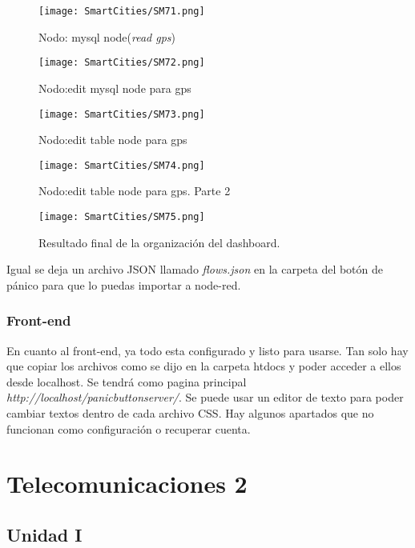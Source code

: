\documentclass[
	11pt, %
	fleqn, %
	a4paper, %
]{LegrandOrangeBook}
\begin{document}
\begin{figure}[H]
\centering\texttt{[image: SmartCities/SM71.png]}
\caption{Nodo: mysql node(\textit{read gps})}
\label{fig:nodomysql4}
\end{figure}
\begin{figure}[H]
\centering\texttt{[image: SmartCities/SM72.png]}
\caption{Nodo:edit mysql node para gps}
\label{fig:nodomysql5}
\end{figure}
\begin{figure}[H]
\centering\texttt{[image: SmartCities/SM73.png]}
\caption{Nodo:edit table node para gps}
\label{fig:nodotable1}
\end{figure}
\begin{figure}[H]
\centering\texttt{[image: SmartCities/SM74.png]}
\caption{Nodo:edit table node para gps. Parte 2}
\label{fig:nodotable2}
\end{figure}
\begin{figure}[H]
\centering\texttt{[image: SmartCities/SM75.png]}
\caption{Resultado final de la organización del dashboard.}
\label{fig:dash}
\end{figure}
Igual se deja un archivo JSON llamado \textit{flows.json} en la carpeta del botón de pánico para que lo puedas importar a node-red.
\newpage
\section{Front-end}
En cuanto al front-end, ya todo esta configurado y listo para usarse. Tan solo hay que copiar los archivos como se dijo en la carpeta htdocs y poder acceder a ellos desde localhost. Se tendrá como pagina principal \textit{http://localhost/panicbuttonserver/}. Se puede usar un editor de texto para poder cambiar textos dentro de cada archivo CSS. Hay algunos apartados que no funcionan como configuración o recuperar cuenta.
\part{Telecomunicaciones 2}

\chapter{Unidad I}
\end{document}
